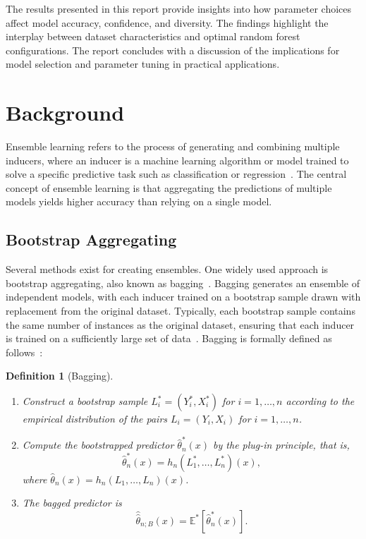 \documentclass[conference]{IEEEtran}
\newtheorem{definition}{Definition}
\begin{document}
The results presented in this report provide insights into how parameter choices affect model accuracy, confidence, and diversity. The findings highlight the interplay between dataset characteristics and optimal random forest configurations. The report concludes with a discussion of the implications for model selection and parameter tuning in practical applications.

\section{Background}

Ensemble learning refers to the process of generating and combining multiple inducers, where an inducer is a machine learning algorithm or model trained to solve a specific predictive task such as classification or regression~\cite{https://doi.org/10.1002/widm.1249}. The central concept of ensemble learning is that aggregating the predictions of multiple models yields higher accuracy than relying on a single model.

\subsection{Bootstrap Aggregating}

Several methods exist for creating ensembles. One widely used approach is bootstrap aggregating, also known as bagging~\cite{Breiman1996}. Bagging generates an ensemble of independent models, with each inducer trained on a bootstrap sample drawn with replacement from the original dataset. Typically, each bootstrap sample contains the same number of instances as the original dataset, ensuring that each inducer is trained on a sufficiently large set of data~\cite{https://doi.org/10.1002/widm.1249}. Bagging is formally defined as follows~\cite{Buhlmann2002}:

\begin{definition}[Bagging]
\begin{enumerate}
    \item Construct a bootstrap sample $L^*_i = (Y^*_i, X^*_i)$ for $i = 1, \ldots, n$ according to the empirical distribution of the pairs $L_i = (Y_i, X_i)$ for $i = 1, \ldots, n$.
    \item Compute the bootstrapped predictor $\hat{\theta}^*_n(x)$ by the plug-in principle, that is,
    \[
        \hat{\theta}^*_n(x) = h_n(L^*_1, \ldots, L^*_n)(x),
    \]
    where $\hat{\theta}_n(x) = h_n(L_1, \ldots, L_n)(x)$.
    \item The bagged predictor is
    \[
        \hat{\hat{\theta}}_{n;B}(x) = \mathbb{E}^*\left[\hat{\theta}^*_n(x)\right].
    \]
\end{enumerate}
\end{definition}
\end{document}
